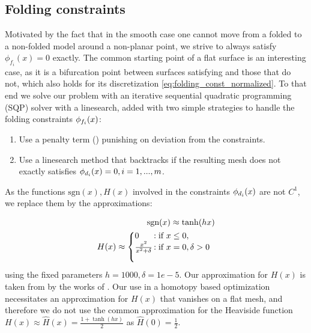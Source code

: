 \subsection{Folding constraints}
Motivated by the fact that in the smooth case one cannot move from a folded to a non-folded model around a non-planar point, we strive to always satisfy $\phi_{f_i}(x) = 0$ exactly. The common starting point of a flat surface is an interesting case, as it is a bifurcation point between surfaces satisfying  and those that do not, which also holds for its discretization \eqref{eq:folding_const_normalized}. To that end we solve our problem with an iterative sequential quadratic programming (SQP) solver with a linesearch, added with two simple strategies to handle the folding constraints $\phi_{f_i}(x)$:
\begin{enumerate}
	\item Use a penalty term (\cite{nocedal}) punishing on deviation from the constraints. \label{opt:penalty}
	\item Use a linesearch method that backtracks if the resulting mesh does not exactly satisfies $\phi_{d_i}(x) = 0, i = 1,...,m$.
\end{enumerate}
As the functions $\text{sgn}(x),H(x)$ involved in the constraints $\phi_{d_i}(x)$ are not $C^1$, we replace them by the approximations:

\begin{align} 
\begin{split}\label{eq:const_inner}
\text{sgn}(x) \approx \tanh(hx) \\
H(x) \approx  \left\{\begin{array}{@{}l@{\thinspace}l}
0  &: \text{if } x \leq 0, \\
\frac{x^2}{x^2+\delta} &: \text{if } x = 0, \delta > 0 \\\\
\end{array}\right.
\end{split}
\end{align}
using the fixed parameters $h=1000,\delta = 1e-5$. Our approximation for $H(x)$ is taken from by the works of \cite{l0_approximation,autocuts}.  Our use in a homotopy based optimization necessitates an approximation for $H(x)$ that vanishes on a flat mesh, and therefore we do not use the common approximation for the Heaviside function $H(x) \approx \hat{H}(x) =  \frac{1+\tanh(hx)}{2}$ as $\hat H(0) = \frac{1}{2}$.

